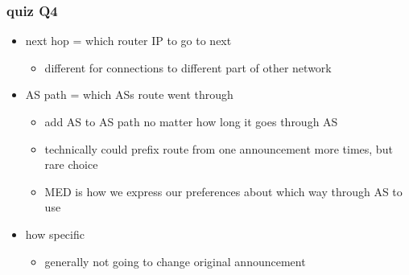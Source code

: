 \begin{frame}
    \frametitle{quiz Q4}
    \begin{itemize}
        \item next hop = which router IP to go to next
            \begin{itemize}
                \item different for connections to different part of other network
            \end{itemize}
        \item AS path = which ASs route went through
            \begin{itemize}
                \item add AS to AS path no matter how long it goes through AS
                \item technically could prefix route from one announcement more times, but rare choice
                \item MED is how we express our preferences about which way through AS to use
            \end{itemize}
        \item how specific
            \begin{itemize}
                \item generally not going to change original announcement
            \end{itemize}
    \end{itemize}
\end{frame}
